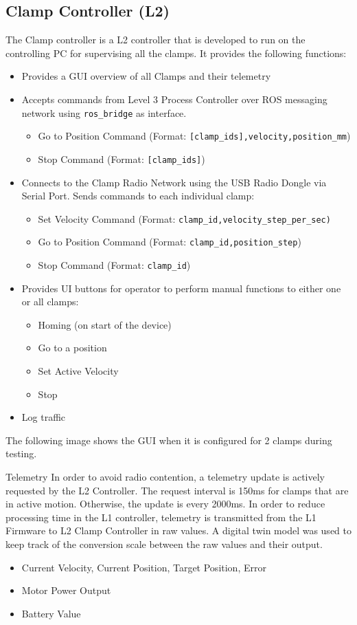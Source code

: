 \subsection{Clamp Controller (L2)}
The Clamp controller is a L2 controller that is developed to run on the controlling PC for supervising all the clamps. It provides the following functions:
\begin{itemize}
    \item Provides a GUI overview of all Clamps and their telemetry
    \item Accepts commands from Level 3 Process Controller over ROS messaging network using \verb|ros_bridge| as interface.
    \begin{itemize}
        \item Go to Position Command (Format: \verb|[clamp_ids],velocity,position_mm|)
        \item Stop Command (Format: \verb|[clamp_ids]|)
    \end{itemize}
    \item Connects to the Clamp Radio Network using the USB Radio Dongle via Serial Port. Sends commands to each individual clamp:
    \begin{itemize}
        \item Set Velocity Command (Format: \verb|clamp_id,velocity_step_per_sec)|
        \item Go to Position Command (Format: \verb|clamp_id,position_step|)
        \item Stop Command (Format: \verb|clamp_id|)
    \end{itemize}
    \item Provides UI buttons for operator to perform manual functions to either one or all clamps:
    \begin{itemize}
        \item Homing (on start of the device)
        \item Go to a position
        \item Set Active Velocity
        \item Stop
    \end{itemize}
    \item Log traffic
\end{itemize}

The following image shows the GUI when it is configured for 2 clamps during testing. 

Telemetry 
In order to avoid radio contention, a telemetry update is actively requested by the L2 Controller. The request interval is 150ms for clamps that are in active motion. Otherwise, the update is every 2000ms. 
In order to reduce processing time in the L1 controller, telemetry is transmitted from the L1 Firmware to L2 Clamp Controller in raw values. A digital twin model was used to keep track of the conversion scale between the raw values and their output.
\begin{itemize}
    \item Current Velocity, Current Position, Target Position, Error
    \item Motor Power Output
    \item Battery Value 
\end{itemize}

